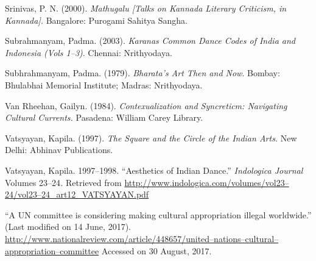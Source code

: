 \begin{thebibliography}{99}
  Srinivas, P. N. (2000). \textit{Mathugalu [Talks on Kannada Literary Criticism, in Kannada].} Bangalore: Purogami Sahitya Sangha.

  Subrahmanyam, Padma. (2003). \textit{Karanas Common Dance Codes of India and Indonesia (Vols 1–3)}. Chennai: Nrithyodaya.

  Subhrahmanyam, Padma. (1979). \textit{Bharata’s Art Then and Now}. Bombay: Bhulabhai Memorial Institute; Madras: Nrithyodaya.

  Van Rheehan, Gailyn. (1984). \textit{Contexualization and Syncreticm: Navigating Cultural Currents.} Pasadena: William Carey Library.

  Vatsyayan, Kapila. (1997). \textit{The Square and the Circle of the Indian Arts.} New Delhi: Abhinav Publications.

  Vatsyayan, Kapila. 1997–1998. “Aesthetics of Indian Dance.” \textit{Indologica Journal }Volumes 23–24\textit{. }Retrieved from \url{http://www.indologica.com/volumes/vol23–24/vol23–24_art12_VATSYAYAN.pdf}

  “A UN committee is considering making cultural appropriation illegal worldwide.” (Last modified on 14 June, 2017). \url{http://www.nationalreview.com/article/448657/united–nations–cultural–appropriation–committee} Accessed on 30 August, 2017.

 \end{thebibliography}

